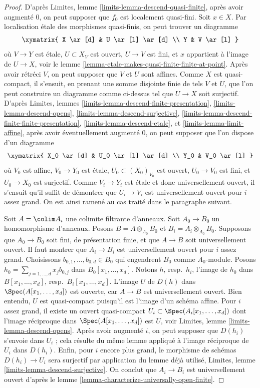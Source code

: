 \begin{proof}
D'après Limites, lemme \ref{limits-lemma-descend-quasi-finite}, après avoir augmenté
$0$, on peut supposer que $f_0$ est localement quasi-fini. Soit $x \in X$.
Par localisation \'etale des morphismes quasi-finis,
on peut trouver un diagramme
$$
\xymatrix{
X \ar[d] & U \ar[l] \ar[d] \\
Y & V \ar[l]
}
$$
où $V \to Y$ est \'etale, $U \subset X_V$ est ouvert, $U \to V$ est fini,
et $x$ appartient à l'image de $U \to X$, voir
le lemme \ref{lemma-etale-makes-quasi-finite-finite-at-point}.
Après avoir rétréci $V$, on peut supposer que $V$ et $U$ sont affines.
Comme $X$ est quasi-compact, il s'ensuit, en prenant une somme disjointe finie
de tels $V$ et $U$, que l'on peut construire un diagramme comme ci-dessus
tel que $U \to X$ soit surjectif. D'après
Limites, lemmes \ref{limits-lemma-descend-finite-presentation},
\ref{limits-lemma-descend-opens},
\ref{limits-lemma-descend-surjective},
\ref{limits-lemma-descend-finite-finite-presentation},
\ref{limits-lemma-descend-etale}, et
\ref{limits-lemma-limit-affine}, après avoir éventuellement augmenté $0$,
on peut supposer que l'on dispose d'un diagramme
$$
\xymatrix{
X_0 \ar[d] & U_0 \ar[l] \ar[d] \\
Y_0 & V_0 \ar[l]
}
$$
où $V_0$ est affine, $V_0 \to Y_0$ est \'etale,
$U_0 \subset (X_0)_{V_0}$ est ouvert, $U_0 \to V_0$ est fini,
et $U_0 \to X_0$ est surjectif. Comme $V_i \to Y_i$ est \'etale
et donc universellement ouvert, il s'ensuit qu'il suffit
de démontrer que $U_i \to V_i$ est universellement ouvert pour
$i$ assez grand. On est ainsi ramené au cas traité dans le paragraphe
suivant.

\medskip\noindent
Soit $A = \colim A_i$ une colimite filtrante d'anneaux.
Soit $A_0 \to B_0$ un homomorphisme d'anneaux. Posons $B = A \otimes_{A_0} B_0$ et
$B_i = A_i \otimes_{A_0} B_0$. Supposons que $A_0 \to B_0$ soit fini,
de présentation finie, et que $A \to B$ soit universellement ouvert.
Il faut montrer que $A_i \to B_i$ est universellement ouvert pour $i$ assez grand.
Choisissons $b_{0, 1}, \ldots, b_{0, d} \in B_0$ qui engendrent $B_0$
comme $A_0$-module. Posons $h_0 = \sum_{j = 1, \ldots, d} x_jb_{0, j}$
dans $B_0[x_1, \ldots, x_d]$. Notons $h$, resp.\ $h_i$, l'image de $h_0$
dans $B[x_1, \ldots, x_d]$, resp.\ $B_i[x_1, \ldots, x_d]$.
L'image $U$ de $D(h)$ dans $\Spec(A[x_1, \ldots, x_d])$ est ouverte,
car $A \to B$ est universellement ouvert. Bien entendu, $U$ est quasi-compact
puisqu'il est l'image d'un schéma affine. Pour $i$ assez grand, il
existe un ouvert quasi-compact $U_i \subset \Spec(A_i[x_1, \ldots, x_d])$
dont l'image réciproque dans $\Spec(A[x_1, \ldots, x_d])$ est $U$, voir
Limites, lemme \ref{limits-lemma-descend-opens}.
Après avoir augmenté $i$, on peut supposer que $D(h_i)$ s'envoie
dans $U_i$ ; cela résulte du même lemme appliqué à
l'image réciproque de $U_i$ dans $D(h_i)$. Enfin, pour $i$ encore plus grand,
le morphisme de schémas $D(h_i) \to U_i$ sera surjectif
par application du lemme déjà utilisé,
Limites, lemme \ref{limits-lemma-descend-surjective}.
On conclut que $A_i \to B_i$ est universellement ouvert d'après le
lemme \ref{lemma-characterize-universally-open-finite}.
\end{proof}

